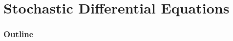 


\newcommand{\RR}{\mathbf R}
\newcommand{\CC}{\mathbf C}
\newcommand{\ZZ}{\mathbf Z}
\newcommand{\ZZn}[1]{\ZZ/{#1}\ZZ}
\newcommand{\QQ}{\mathbf Q}
\newcommand{\rr}{\mathbb R}
\newcommand{\cc}{\mathbb C}
\newcommand{\zz}{\mathbb Z}
\newcommand{\zzn}[1]{\zz/{#1}\zz}
\newcommand{\qq}{\mathbb Q}
\newcommand{\calM}{\mathcal M}
\newcommand{\latex}{\LaTeX}
\newcommand{\tex}{\TeX}
\newcommand{\sm}{\setminus} 

\newcommand{\tfix}{\rule{0pt}{2.6ex}}
\newcommand{\bfix}{\rule[-1.2ex]{0pt}{0pt}}



\newcommand{\intf}[1]{\int_a^b{#1}\,dx}
\newcommand{\intfb}[3]{\int_{#1}^{#2}{#3}\,dx}
\newcommand{\marginalfootnote}[1]{%
        \footnote{#1}
        \marginpar[\hfill{\sf\thefootnote}]{{\sf\thefootnote}}}
\newcommand{\edit}[1]{\marginalfootnote{#1}}


\newcommand{\Tr}{\operatorname {Tr}}
\newcommand{\GL}{\operatorname {GL}}
\newcommand{\SL}{\operatorname {SL}}
\newcommand{\Prob}{\operatorname {Prob}}
\newcommand{\re}{\operatorname {Re}}
\newcommand{\im}{\operatorname {Im}}






\section{Stochastic Differential Equations}
\begin{frame}
  \frametitle{Outline}
  \tableofcontents[ currentsection ]
\end{frame}

